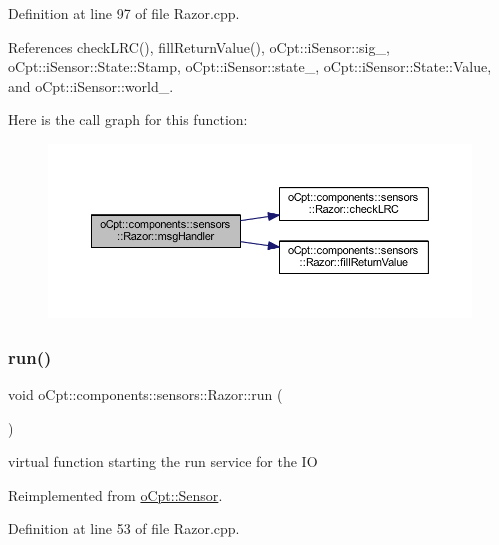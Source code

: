 Definition at line 97 of file Razor.\+cpp.



References check\+L\+R\+C(), fill\+Return\+Value(), o\+Cpt\+::i\+Sensor\+::sig\+\_\+, o\+Cpt\+::i\+Sensor\+::\+State\+::\+Stamp, o\+Cpt\+::i\+Sensor\+::state\+\_\+, o\+Cpt\+::i\+Sensor\+::\+State\+::\+Value, and o\+Cpt\+::i\+Sensor\+::world\+\_\+.

Here is the call graph for this function\+:\nopagebreak
\begin{figure}[H]
\begin{center}
\leavevmode
\includegraphics[width=350pt]{classo_cpt_1_1components_1_1sensors_1_1_razor_a8d8e051113a86789851faca74d3da303_cgraph}
\end{center}
\end{figure}
\hypertarget{classo_cpt_1_1components_1_1sensors_1_1_razor_ad93891ffb2d47e56d1417f0a40026c6e}{}\label{classo_cpt_1_1components_1_1sensors_1_1_razor_ad93891ffb2d47e56d1417f0a40026c6e} 
\subsubsection{\texorpdfstring{run()}{run()}}
{\footnotesize\ttfamily void o\+Cpt\+::components\+::sensors\+::\+Razor\+::run (\begin{DoxyParamCaption}{ }\end{DoxyParamCaption})\hspace{0.3cm}{\ttfamily [virtual]}}

virtual function starting the run service for the IO 

Reimplemented from \hyperlink{classo_cpt_1_1_sensor_aef25b0e5f3a8358ee81c97c73909fbe6}{o\+Cpt\+::\+Sensor}.



Definition at line 53 of file Razor.\+cpp.



